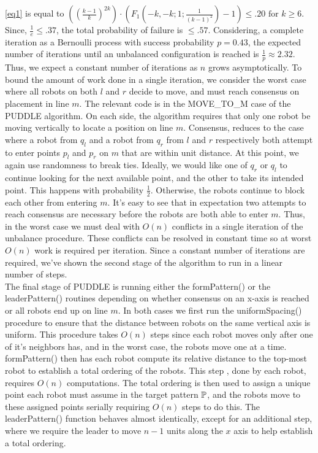 \documentclass[preprint,10pt]{elsarticle}
\begin{document}
		\ref{eq1} is equal to $((\frac{k-1}{k})^{2k} ) \cdot ( F_1(-k, -k ; 1 ; \frac{1}{(k-1)^2}) - 1) \leq .20 \text{ for } 
		k \geq 6$. Since, $\frac{1}{e} \leq .37$, the total probability of failure is $\leq .57$. Considering, a complete
		iteration as a Bernoulli process with success probability $p = 0.43$, the expected number of iterations until 
		an unbalanced configuration is reached is $\frac{1}{p} \approx 2.32$. Thus, we expect a constant number of iterations
		as $n$ grows asymptotically. To bound the amount of work done in a single iteration, we consider the worst case
		where all robots on both $l$ and $r$ decide to move, and must reach consensus on placement in line $m$. 
		The relevant code is in the MOVE\_TO\_M case of the PUDDLE algorithm. On each side, the algorithm requires that only 
		one robot be moving vertically to locate a position on line $m$. Consensus, reduces to the case where a robot
		from $q_l$ and a robot from $q_r$ from $l$ and $r$ respectively both attempt to enter 
		points $p_l$ and $p_r$ on $m$ that are within unit distance. At this point, we again use randomness
		to break ties. Ideally, we would like one of $q_r$ or $q_l$ to continue looking for the next available point,
		and the other to take its intended point. This happens with probability $\frac{1}{2}$. Otherwise, the robots 
		continue to block each other from entering $m$. It's easy to see that in expectation two attempts to reach
		consensus are necessary before the robots are both able to enter $m$. Thus, in the worst case we must deal with
		$O(n)$ conflicts in a single iteration of the unbalance procedure. These conflicts can be resolved in 
		constant time so at worst $O(n)$ work is required per iteration. Since a constant number of iterations are 
		required, we've shown the second stage of the algorithm to run in a linear number of steps. \\

		The final stage of PUDDLE is running either the formPattern() or the leaderPattern() routines depending on
		whether consensus on an x-axis is reached or all robots end up on line $m$. In both cases we first run the 
		uniformSpacing() procedure to ensure that the distance between robots on the same vertical axis is uniform.
		This procedure takes $O(n)$ steps since each robot moves only after one of it's neighbors has, and in 
		the worst case, the robots move one at a time. formPattern() then has each robot compute its relative
		distance to the top-most robot to establish a total ordering of the robots. This step
		, done by each robot, requires $O(n)$ computations. The total ordering is then used to assign a
		unique point each robot must assume in the target pattern $\mathbb{P}$, and the robots move to these 
		assigned points serially requiring $O(n)$ steps to do this. The leaderPattern() function behaves almost
		identically, except for an additional step, where we require the leader to move $n-1$ units along the
		$x$ axis to help establish a total ordering. \\
\end{document}
